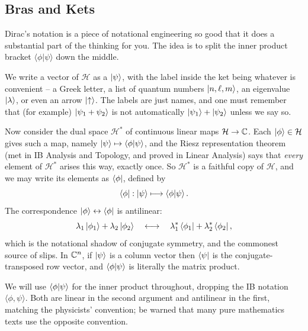 \documentclass[a4paper]{scrartcl}
\newcommand{\inp}[2]{\langle #1, #2 \rangle}
\begin{document}
\subsection{Bras and Kets}

Dirac's notation is a piece of notational engineering so good that it does a substantial part of the thinking for you. The idea is to split the inner product bracket $\langle \phi | \psi \rangle$ down the middle.

We write a vector of $\mathcal{H}$ as a  $\ket{\psi}$, with the label inside the ket being whatever is convenient -- a Greek letter, a list of quantum numbers $\ket{n, \ell, m}$, an eigenvalue $\ket{\lambda}$, or even an arrow $\ket{\uparrow}$. The labels are just names, and one must remember that (for example) $\ket{\psi_1 + \psi_2}$ is not automatically $\ket{\psi_1} + \ket{\psi_2}$ unless we say so.

Now consider the dual space $\mathcal{H}^*$ of continuous linear maps $\mathcal{H} \to \mathbb{C}$. Each $\ket{\phi} \in \mathcal{H}$ gives such a map, namely $\ket{\psi} \mapsto \braket{\phi}{\psi}$, and the Riesz representation theorem (met in IB Analysis and Topology, and proved in Linear Analysis) says that \emph{every} element of $\mathcal{H}^*$ arises this way, exactly once. So $\mathcal{H}^*$ is a faithful copy of $\mathcal{H}$, and we may write its elements as  $\bra{\phi}$, defined by
$$
\bra{\phi} : \ket{\psi} \longmapsto \braket{\phi}{\psi}.
$$
The correspondence $\ket{\phi} \leftrightarrow \bra{\phi}$ is antilinear:
$$
\lambda_1 \ket{\phi_1} + \lambda_2 \ket{\phi_2} \quad \longleftrightarrow \quad \lambda_1^* \bra{\phi_1} + \lambda_2^* \bra{\phi_2},
$$
which is the notational shadow of conjugate symmetry, and the commonest source of slips. In $\mathbb{C}^n$, if $\ket{\psi}$ is a column vector then $\bra{\psi}$ is the conjugate-transposed row vector, and $\braket{\phi}{\psi}$ is literally the matrix product.

\begin{notation}
    We will use $\braket{\phi}{\psi}$ for the inner product throughout, dropping the IB notation $\inp{\phi}{\psi}$. Both are linear in the second argument and antilinear in the first, matching the physicists' convention; be warned that many pure mathematics texts use the opposite convention.
\end{notation}
\end{document}
